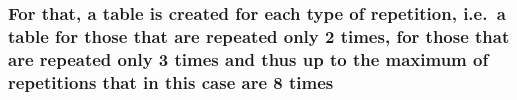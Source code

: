 \documentclass[11pt]{article}
\begin{document}
\hypertarget{for-that-a-table-is-created-for-each-type-of-repetition-i.e.-a-table-for-those-that-are-repeated-only-2-times-for-those-that-are-repeated-only-3-times-and-thus-up-to-the-maximum-of-repetitions-that-in-this-case-are-8-times}{%
\subsubsection{For that, a table is created for each type of repetition,
i.e.~a table for those that are repeated only 2 times, for those that
are repeated only 3 times and thus up to the maximum of repetitions that
in this case are 8
times}\label{for-that-a-table-is-created-for-each-type-of-repetition-i.e.-a-table-for-those-that-are-repeated-only-2-times-for-those-that-are-repeated-only-3-times-and-thus-up-to-the-maximum-of-repetitions-that-in-this-case-are-8-times}}
\end{document}
